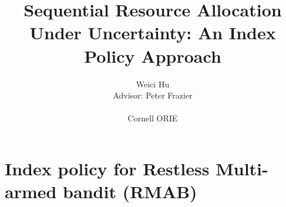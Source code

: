 \documentclass{beamer}
\begin{document}
\title{Sequential Resource Allocation Under Uncertainty: An Index Policy Approach}
\author{Weici Hu\\
Advisor: Peter Frazier\\
\hspace{1mm}\\
Cornell ORIE}

\begin{frame}[plain]
   \maketitle
\end{frame}
\begin{frame}[plain]
\tableofcontents[hidesubsubsections]
\end{frame}
\section{Index policy for Restless Multi-armed bandit (RMAB)}
\end{document}

